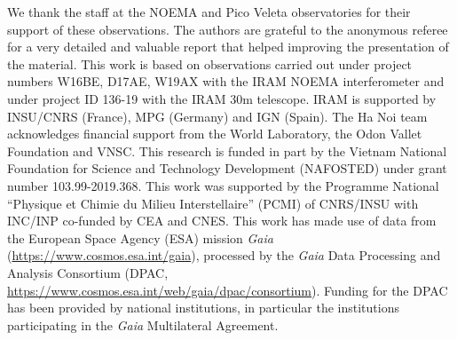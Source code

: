 \documentclass{aa}
\begin{document}
\begin{acknowledgements}

We thank the staff at the NOEMA and Pico Veleta observatories for
their support of these observations. The authors are grateful to
the anonymous referee for a very detailed and valuable report that
helped improving the presentation of the material. This work is
based on observations carried out under project numbers W16BE, D17AE,
W19AX with the IRAM NOEMA interferometer and under project ID 136-19
with the IRAM 30m telescope. IRAM is supported by INSU/CNRS (France),
MPG (Germany) and IGN (Spain). The Ha Noi team acknowledges financial
support from the World Laboratory, the Odon Vallet Foundation and
VNSC.  This research is funded in part by the Vietnam National
Foundation for Science and Technology Development (NAFOSTED) under
grant number 103.99-2019.368. This work was supported by the Programme
National ``Physique et Chimie du Milieu Interstellaire'' (PCMI) of
CNRS/INSU with INC/INP co-funded by CEA and CNES.  This work has made
use of data from the European Space Agency (ESA) mission {\it Gaia}
(\url{https://www.cosmos.esa.int/gaia}), processed by the {\it Gaia}
Data Processing and Analysis Consortium (DPAC,
\url{https://www.cosmos.esa.int/web/gaia/dpac/consortium}). Funding
for the DPAC has been provided by national institutions, in particular
the institutions participating in the {\it Gaia} Multilateral
Agreement.

\end{acknowledgements}

%
%
%
%


%
\end{document}
